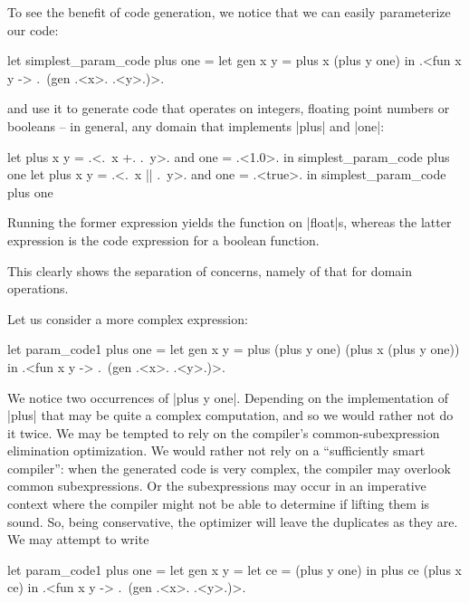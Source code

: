 \documentclass{llncs}
\begin{document}
To see the benefit of code generation, we notice that we can easily
parameterize our code:

\begin{code}
let simplest_param_code plus one =
  let gen x y = plus x (plus y one) in
  .<fun x y -> .~(gen .<x>. .<y>.)>.
\end{code}

\noindent and use it to generate code that operates on integers, floating point
numbers or booleans -- in general, any domain that implements |plus|
and |one|:
\begin{code}
let plus x y = .<.~x +. .~y>. and one = .<1.0>. in
  simplest_param_code plus one
let plus x y = .<.~x || .~y>. and one = .<true>. in
  simplest_param_code plus one
\end{code}
Running the former expression yields the function on |float|s, whereas
the latter expression is the code expression for a boolean function.

This clearly shows the separation of concerns, namely of that for domain
operations.

Let us consider a more complex expression:
\begin{code}
let param_code1 plus one =
  let gen x y = plus (plus y one) (plus x (plus y one)) in
  .<fun x y -> .~(gen .<x>. .<y>.)>.
\end{code}

We notice two occurrences of |plus y one|. Depending on the
implementation of |plus| that may be quite a complex computation, and
so we would rather not do it twice. We may be tempted to rely on the
compiler's common-subexpression elimination optimization. We would
rather not rely on a ``sufficiently smart compiler'': when the
generated code is very complex, the compiler may overlook common
subexpressions.  Or the subexpressions may occur in an imperative
context where the compiler might not be able to determine if lifting
them is sound. So, being conservative, the optimizer will leave the
duplicates as they are. We may attempt to write

\begin{code}
let param_code1 plus one =
  let gen x y = 
     let ce = (plus y one) in  plus ce (plus x ce) in
  .<fun x y -> .~(gen .<x>. .<y>.)>.
\end{code}
\end{document}
